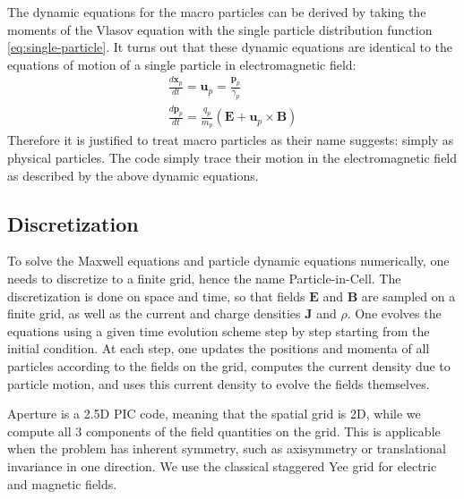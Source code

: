 The dynamic equations for the macro particles can be derived by taking
the moments of the Vlasov equation with the single particle
distribution function \eqref{eq:single-particle}. It turns out that
these dynamic equations are identical to the equations of motion of a
single particle in electromagnetic field:
\begin{align}
  \label{eq:particle-equations}
  \frac{d\mathbf{x}_p}{dt} = \mathbf{u}_p = \frac{\mathbf{p}_p}{\gamma_p} \\
  \frac{d\mathbf{p}_p}{dt} = \frac{q_p}{m_p}(\mathbf{E} + \mathbf{u}_p\times \mathbf{B})
\end{align}
Therefore it is justified to treat macro particles as their name
suggests: simply as physical particles. The code simply trace their
motion in the electromagnetic field as described by the above dynamic
equations.

\subsection{Discretization}
\label{sec:discretization}

To solve the Maxwell equations and particle dynamic equations
numerically, one needs to discretize to a finite grid, hence the name
Particle-in-Cell. The discretization is done on space and time, so
that fields $\mathbf{E}$ and $\mathbf{B}$ are sampled on a
finite grid, as well as the current and charge densities
$\mathbf{J}$ and $\rho$. One evolves the equations using a given
time evolution scheme step by step starting from the initial
condition. At each step, one updates the positions and momenta of all
particles according to the fields on the grid, computes the current
density due to particle motion, and uses this current density to
evolve the fields themselves.

Aperture is a 2.5D PIC code, meaning that the spatial grid is 2D,
while we compute all 3 components of the field quantities on the
grid. This is applicable when the problem has inherent symmetry, such
as axisymmetry or translational invariance in one direction. We use
the classical staggered Yee grid for electric and magnetic fields.


